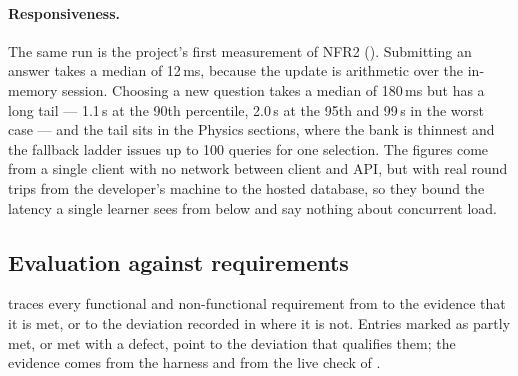 \paragraph{Responsiveness.} The same run is the project's first measurement of
NFR2 (). Submitting an answer takes a median of 12\,ms,
because the update is arithmetic over the in-memory session. Choosing a new
question takes a median of 180\,ms but has a long tail --- 1.1\,s at the 90th
percentile, 2.0\,s at the 95th and 99\,s in the worst case --- and the tail sits
in the Physics sections, where the bank is thinnest and the fallback ladder
issues up to 100 queries for one selection. The figures come from a single
client with no network between client and API, but with real round trips from
the developer's machine to the hosted database, so they bound the latency a
single learner sees from below and say nothing about concurrent load.



\subsection{Evaluation against requirements}

 traces every functional and non-functional requirement
from  to the evidence that it is met, or to the deviation
recorded in  where it is not. Entries marked as partly met,
or met with a defect, point to the deviation that qualifies them; the evidence
comes from the harness and from the live check of .

